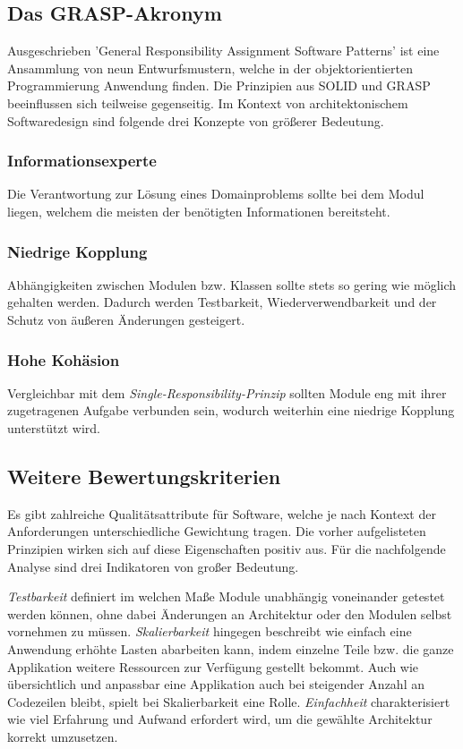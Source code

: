 \documentclass[conference]{IEEEtran}
\begin{document}
\subsection{Das GRASP-Akronym} Ausgeschrieben 'General Responsibility Assignment Software Patterns' ist eine Ansammlung von neun Entwurfsmustern, welche in der objektorientierten Programmierung Anwendung finden. \cite{Larman.2009} Die Prinzipien aus SOLID und GRASP beeinflussen sich teilweise gegenseitig. Im Kontext von architektonischem Softwaredesign sind folgende drei Konzepte von größerer Bedeutung. 

\subsubsection{Informationsexperte} Die Verantwortung zur Lösung eines Domainproblems sollte bei dem Modul liegen, welchem die meisten der benötigten Informationen bereitsteht.

\subsubsection{Niedrige Kopplung} Abhängigkeiten zwischen Modulen bzw. Klassen sollte stets so gering wie möglich gehalten werden. Dadurch werden Testbarkeit, Wiederverwendbarkeit und der Schutz von äußeren Änderungen gesteigert.

\subsubsection{Hohe Kohäsion} Vergleichbar mit dem \emph{Single-Responsibility-Prinzip} sollten Module eng mit ihrer zugetragenen Aufgabe verbunden sein, wodurch weiterhin eine niedrige Kopplung unterstützt wird.



\subsection{Weitere Bewertungskriterien} Es gibt zahlreiche Qualitätsattribute für Software, welche je nach Kontext der Anforderungen unterschiedliche Gewichtung tragen. Die vorher aufgelisteten Prinzipien wirken sich auf diese Eigenschaften positiv aus. Für die nachfolgende Analyse sind drei Indikatoren von großer Bedeutung. 

\emph{Testbarkeit} definiert im welchen Maße Module unabhängig voneinander getestet werden können, ohne dabei Änderungen an Architektur oder den Modulen selbst vornehmen zu müssen. \emph{Skalierbarkeit} hingegen beschreibt wie einfach eine Anwendung erhöhte Lasten abarbeiten kann, indem einzelne Teile bzw. die ganze Applikation weitere Ressourcen zur Verfügung gestellt bekommt. Auch wie übersichtlich und anpassbar eine Applikation auch bei steigender Anzahl an Codezeilen bleibt, spielt bei Skalierbarkeit eine Rolle. \emph{Einfachheit} charakterisiert wie viel Erfahrung und Aufwand erfordert wird, um die gewählte Architektur korrekt umzusetzen.
\end{document}
